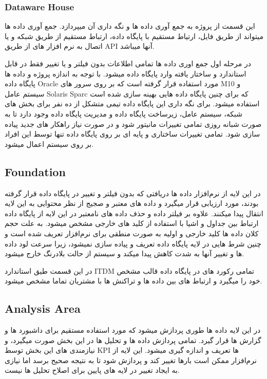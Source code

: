 \documentclass{llncs}
\begin{document}
\subsubsection{Dataware House}
این قسمت از پروژه به جمع آوری داده ها و نگه داری آن میپردازد.
جمع آوری داده ها میتواند از طریق فایل، ارتیاط مستقیم با پایگاه داده، ارتباط مستقیم از طریق شبکه و یا اتصال به نرم افزار های از طریق API آنها میباشد.

در مرحله اول جمع اوری داده ها تمامی اطلاعات بدون فیلتر و یا تغییر فقط در قابل استاندارد و ساختار یافته وارد پایگاه داده میشود.
با توجه به اندازه پروژه و داده ها پایگاه داده Oracle مورد استفاده قرار گرفته است که بر روی سرور های M10 و سیستم عامل Solaris Sparc که برای چنین پایگاه داده هایی بهینه سازی شده است استفاده میشود.
برای نگه داری این پایگاه داده تیمی متشکل از ده نفر برای بخش های شبکه، سیستم عامل، زیرساخت پایگاه داده و مدیریت پایگاه داده وجود دارد تا به صورت شبانه روزی تمامی تغییرات مانیتور شود و در صورت نیاز راهکار های جدید پیاده سازی شود.
تمامی تغییرات ساختاری و پایه ای بر روی پایگاه داده تنها توسط این افراد بر روی سیستم اعمال میشود.

\subsection{Foundation}
در این لایه از نرم‌افزار داده ها دریافتی که بدون فیلتر و تغییر در پایگاه داده قرار گرفته بودند، مورد ارزیابی قرار میگیرد و داده های معتبر و صجیج از نظر محتوایی به این لایه انتقال پیدا میکنند.
علاوه بر فیلتر داده و حذف داده های نامعتبر در این لایه از پایگاه داده ارتباط بین جداول و اشیا با استفاده از کلید های خارجی مشخص میشود.
به علت حجم کلان داده ها کلید خارجی و اولیه به صورت منطقی برای نرم‌افزار تعریف شده است و چنین شرط هایی در لایه پایگاه داده تعریف و پیاده سازی نمیشود، زیرا سرعت لود داده ها و تغییر آنها به شدت کاهش پیدا میکند و سیستم از حالت بلادرنگ خارج میشود.

در این قسمت طیق استاندارد ITDM تمامی رکورد های در پایگاه داده قالب مشخص خود را میگیرد و ارتباط های بین داده ها و تراکنش ها با مشتریان تماما مشخص میشود.



\subsection{Analysis Area}
در این لایه داده ها طوری پردازش میشود که مورد استفاده مستقیم برای داشبورد ها و گزارش ها قرار گیرد.
تمامی پردازش داده ها و تحلیل ها در این بخش صورت میگیرد، و نیازمندی های این بخش توسط KPI ها تعریف و اندازه گیری میشود.
این لایه از نرم‌افزار ممکن است بارها تغییر کند و پردازش شود تا به نتیجه صحیح برسد اما نیازی به ایجاد تغییر در لایه های پایین برای اصلاح تحلیل ها نیست.
\end{document}
